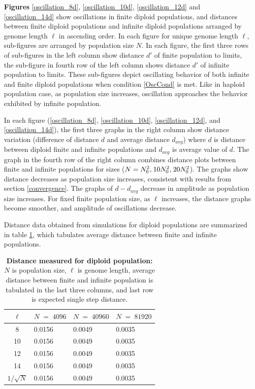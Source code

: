 \textbf{ Figures} \ref{oscillation_8d}, \ref{oscillation_10d}, \ref{oscillation_12d} 
and \ref{oscillation_14d} show oscillations in finite diploid populations, and distances 
between finite diploid populations and infinite diploid populations arranged by genome length $\ell$ in ascending order. 
In each figure for unique genome length $\ell$, sub-figures 
are arranged by population size $N$. In each figure, the first three rows of sub-figures in the left column show distance $d'$ of finite population 
to limits, the sub-figure in fourth row of the left column shows distance $d'$ of infinite population to limits. These sub-figures depict 
oscillating behavior of both infinite and finite diploid populations when condition \ref{OscCond} is met. 
Like in haploid population case, as population size increases, oscillation approaches the behavior exhibited by infinite population. 

In each figure (\ref{oscillation_8d}, \ref{oscillation_10d}, \ref{oscillation_12d}, 
and \ref{oscillation_14d}), the first three graphs in the right column show 
distance variation (difference of distance $d$ and average distance $d_{avg}$)  
where $d$ is distance between diploid finite and infinite populations and $d_{avg}$ is average value of $d$. 
The graph in the fourth row of the right column combines distance plots between finite and infinite populations for sizes 
($N = N_0^2, \hspace{0.01in}10N_0^2, \hspace{0.01in}20N_0^2$). The graphs show distance decreases 
as population size increases, consistent with results from section \ref{convergence}. 
The graphs of $d-d_{avg}$ decrease in amplitude as population size increases. 
For fixed finite population size, as $\ell$ increases, the distance graphs become smoother, and amplitude of oscillations decrease.

Distance data obtained from simulations for diploid populations are summarized in table \ref{tableDistanceOscDip}, 
which tabulates average distance between finite and infinite populations. 
\begin{table}[h]
\caption[\textbf{Distance measured for diploid population}]{\textbf{Distance measured for diploid population:} $N$ is population size, $\ell$ is genome length, 
average distance between finite and infinite population is tabulated in the last three columns, and last row is expected single step distance.}
\centering
\begin{tabularx}{0.75\textwidth}{ c *{3}{X}}
\toprule
$\ell$ & $N \;=\; 4096 $ & $N \;=\; 40960 $ & $N \;=\; 81920 $\\
\midrule
8 & 0.0156 & 0.0049 & 0.0035 \\
10 & 0.0156 & 0.0049 & 0.0035 \\
12 & 0.0156 & 0.0049 & 0.0035 \\
14 & 0.0156 & 0.0049 & 0.0035 \\
\midrule
$1/\sqrt{N}$ & 0.0156 & 0.0049 & 0.0035 \\
\bottomrule
\end{tabularx}
\label{tableDistanceOscDip}
\end{table}

